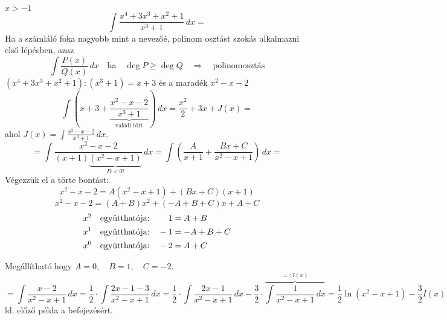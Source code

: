 \documentclass[a4paper,11.5pt]{article}
\begin{document}
	\begin{task}$x>-1$
		\[ \int\frac{x^4+3x^3+x^2+1}{x^3+1}\,dx= \]
		Ha a számláló foka nagyobb mint a nevezőé, polinom osztást szokás alkalmazni első lépésben, azaz
		\[ \int\frac{P(x)}{Q(x)}\,dx\quad \text{ha}\quad \deg P\geq\deg Q\quad \Rightarrow\quad \text{polinomosztás} \]
		$(x^4+3x^3+x^2+1):(x^3+1)=x+3$ és a maradék $x^2-x-2$
		\[ \int\left(x+3+\underbrace{\frac{x^2-x-2}{x^3+1}}_{\text{valódi tört}}\right)\,dx=\frac{x^2}{2}+3x+J(x)= \]
		ahol $J(x)=\int\frac{x^2-x-2}{x^3+1}\,dx$.
		\[ =\int\frac{x^2-x-2}{(x+1)\underbrace{(x^2-x+1)}_{D<0!}}\,dx=\int\left(\frac{A}{x+1}+\frac{Bx+C}{x^2-x+1}\right)\,dx= \]
		Végezzük el a törte bontást:
		\[ x^2-x-2=A(x^2-x+1)+(Bx+C)(x+1) \]
		\[ x^2-x-2=(A+B)x^2+(-A+B+C)x+A+C \]
		\begin{align*}
			x^2 \quad \text{együtthatója:}&\hspace{7.8mm} 1=A+B\\
			x^1 \quad \text{együtthatója:}& \quad -1=-A+B+C\\
			x^0 \quad \text{együtthatója:}&\quad  -2=A+C\\
		\end{align*}
		
		Megállítható hogy $A=0,\quad B=1,\quad C=-2$.
		\[=\int\frac{x-2}{x^2-x+1}\,dx=\frac{1}{2}\cdot\int\frac{2x-1-3}{x^2-x+1}\,dx=\frac{1}{2}\cdot\int\frac{2x-1}{x^2-x+1}\,dx-\frac{3}{2}\cdot\overbrace{\int\frac{1}{x^2-x+1}\,dx}^{=:I(x)}= \frac{1}{2}\ln(x^2-x+1)-\frac{3}{2}I(x) \]
		ld. előző példa a befejezésért.
	\end{task}
\end{document}
